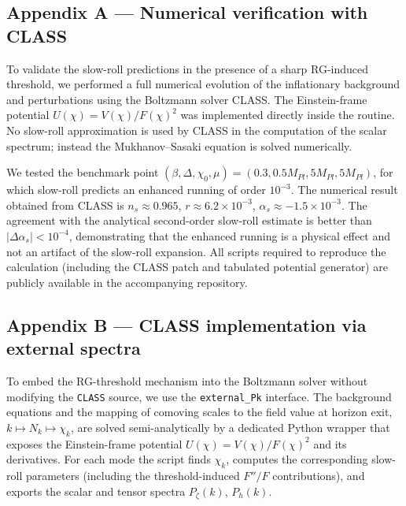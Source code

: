 \documentclass[
]{article}
\begin{document}
\subsection{Appendix A --- Numerical verification with
CLASS}\label{appendix-a-numerical-verification-with-class}

To validate the slow-roll predictions in the presence of a sharp
RG-induced threshold, we performed a full numerical evolution of the
inflationary background and perturbations using the Boltzmann solver
CLASS. The Einstein-frame potential \(U(\chi) = V(\chi)/F(\chi)^{2}\)
was implemented directly inside the routine. No slow-roll approximation
is used by CLASS in the computation of the scalar spectrum; instead the
Mukhanov--Sasaki equation is solved numerically.

We tested the benchmark point
\((\beta, \Delta, \chi_{0}, \mu) = (0.3, 0.5 M_{Pl}, 5 M_{Pl}, 5 M_{Pl})\),
for which slow-roll predicts an enhanced running of order \(10^{- 3}\).
The numerical result obtained from CLASS is \(n_{s} \approx 0.965\),
\(r \approx 6.2 \times 10^{- 3}\),
\(\alpha_{s} \approx - 1.5 \times 10^{- 3}\). The agreement with the
analytical second-order slow-roll estimate is better than
\(|\Delta\alpha_{s}| < 10^{- 4}\), demonstrating that the enhanced
running is a physical effect and not an artifact of the slow-roll
expansion. All scripts required to reproduce the calculation (including
the CLASS patch and tabulated potential generator) are publicly
available in the accompanying repository.

\subsection{Appendix B --- CLASS implementation via external
spectra}\label{appendix-b-class-implementation-via-external-spectra}

To embed the RG-threshold mechanism into the Boltzmann solver without
modifying the \texttt{CLASS} source, we use the \texttt{external\_Pk}
interface. The background equations and the mapping of comoving scales
to the field value at horizon exit, \(k \mapsto N_k \mapsto \chi_k\),
are solved semi-analytically by a dedicated Python wrapper that exposes
the Einstein-frame potential \(U(\chi) = V(\chi)/F(\chi)^2\) and its
derivatives. For each mode the script finds \(\chi_k\), computes the
corresponding slow-roll parameters (including the threshold-induced
\(F''/F\) contributions), and exports the scalar and tensor spectra
\(P_\zeta(k)\), \(P_h(k)\).
\end{document}
